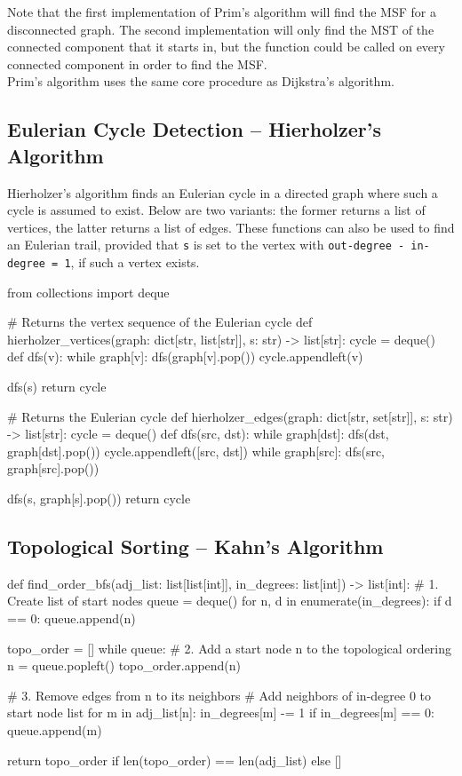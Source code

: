 \documentclass[12pt, titlepage]{article}
\begin{document}
Note that the first implementation of Prim's algorithm will find the MSF for a disconnected graph. The second implementation will only find the MST of the connected component that it starts in, but the function could be called on every connected component in order to find the MSF. \\

Prim's algorithm uses the same core procedure as Dijkstra's algorithm.

\subsection{Eulerian Cycle Detection -- Hierholzer's Algorithm} \label{hierholzer}

Hierholzer's algorithm finds an Eulerian cycle in a directed graph where such a cycle is assumed to exist. Below are two variants: the former returns a list of vertices, the latter returns a list of edges. These functions can also be used to find an Eulerian trail, provided that \texttt{s} is set to the vertex with \texttt{out-degree - in-degree = 1}, if such a vertex exists. \medskip

\begin{python}
from collections import deque

# Returns the vertex sequence of the Eulerian cycle
def hierholzer_vertices(graph: dict[str, list[str]], s: str) -> list[str]:
    cycle = deque()
    def dfs(v):
        while graph[v]:
            dfs(graph[v].pop())
        cycle.appendleft(v)

    dfs(s)
    return cycle


# Returns the Eulerian cycle
def hierholzer_edges(graph: dict[str, set[str]], s: str) -> list[str]:
    cycle = deque()
    def dfs(src, dst):
        while graph[dst]:
            dfs(dst, graph[dst].pop())
        cycle.appendleft([src, dst])
        while graph[src]:
            dfs(src, graph[src].pop())

    dfs(s, graph[s].pop())
    return cycle
\end{python}

\subsection{Topological Sorting -- Kahn's Algorithm} \label{kahn}
\begin{python}
def find_order_bfs(adj_list: list[list[int]],
                   in_degrees: list[int]) -> list[int]:
    # 1. Create list of start nodes
    queue = deque()
    for n, d in enumerate(in_degrees):
        if d == 0:
            queue.append(n)

    topo_order = []
    while queue:
        # 2. Add a start node n to the topological ordering
        n = queue.popleft()
        topo_order.append(n)

        # 3. Remove edges from n to its neighbors
        #    Add neighbors of in-degree 0 to start node list
        for m in adj_list[n]:
            in_degrees[m] -= 1
            if in_degrees[m] == 0:
                queue.append(m)

    return topo_order if len(topo_order) == len(adj_list) else []
\end{python}
\end{document}
